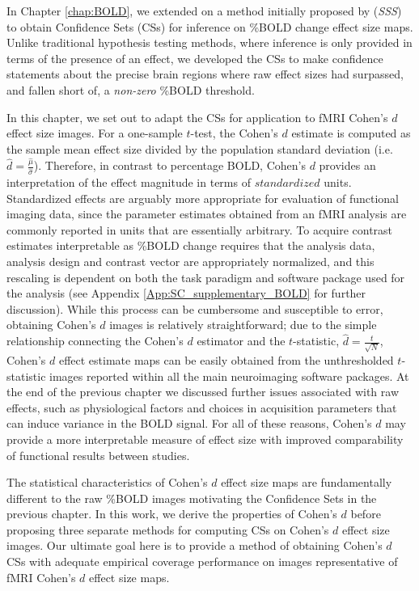 In Chapter \ref{chap:BOLD}, we extended on a method initially proposed by \citet*{Sommerfeld2018-zl} (\textit{SSS}) to obtain Confidence Sets (CSs) for inference on \%BOLD change effect size maps. Unlike traditional hypothesis testing methods, where inference is only provided in terms of the presence of an effect, we developed the CSs to make confidence statements about the precise brain regions where raw effect sizes had surpassed, and fallen short of, a \textit{non-zero} \%BOLD threshold.

In this chapter, we set out to adapt the CSs for application to fMRI Cohen's $d$ effect size images. For a one-sample $t$-test, the Cohen's $d$ estimate is computed as the sample mean effect size divided by the population standard deviation \Big(i.e.\ $\hat{d} = \frac{\hat{\mu}}{\hat{\sigma}}$\Big). Therefore, in contrast to percentage BOLD, Cohen's $d$ provides an interpretation of the effect magnitude in terms of $standardized$ units. Standardized effects are arguably more appropriate for evaluation of functional imaging data, since the parameter estimates obtained from an fMRI analysis are commonly reported in units that are essentially arbitrary. To acquire contrast estimates interpretable as \%BOLD change requires that the analysis data, analysis design and contrast vector are appropriately normalized, and this rescaling is dependent on both the task paradigm and software package used for the analysis (see Appendix \ref{App:SC_supplementary_BOLD} for further discussion). While this process can be cumbersome and susceptible to error, obtaining Cohen's $d$ images is relatively straightforward; due to the simple relationship connecting the Cohen's $d$ estimator and the $t$-statistic, $\hat{d} = \frac{t}{\sqrt{N}}$, Cohen's $d$ effect estimate maps can be easily obtained from the unthresholded $t$-statistic images reported within all the main neuroimaging software packages. At the end of the previous chapter we discussed further issues associated with raw effects, such as physiological factors and choices in acquisition parameters that can induce variance in the BOLD signal. For all of these reasons, Cohen's $d$ may provide a more interpretable measure of effect size with improved comparability of functional results between studies.

The statistical characteristics of Cohen's $d$ effect size maps are fundamentally different to the raw \%BOLD images motivating the Confidence Sets in the previous chapter. In this work, we derive the properties of Cohen's $d$ before proposing three separate methods for computing CSs on Cohen's $d$ effect size images. Our ultimate goal here is to provide a method of obtaining Cohen's $d$ CSs with adequate empirical coverage performance on images representative of fMRI Cohen's $d$ effect size maps. 

